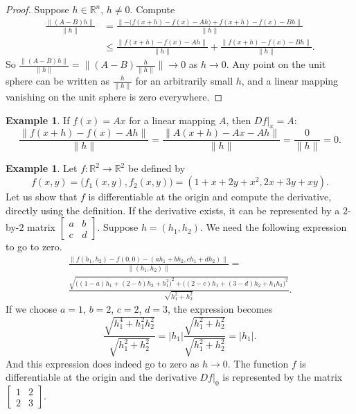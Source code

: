 \documentclass[12pt,openany]{book}
\newcommand{\sabs}[1]{\lvert {#1} \rvert}
\newcommand{\snorm}[1]{\lVert {#1} \rVert}
\newcommand{\bnorm}[1]{\bigl\lVert {#1} \bigr\rVert}
\newcommand{\R}{{\mathbb{R}}}
\theoremstyle{plain}
\theoremstyle{remark}
\theoremstyle{definition}
\theoremstyle{exercise}
\theoremstyle{example}
\newtheorem{example}[thm]{Example}
\begin{document}
\begin{proof}
Suppose $h \in \R^n$, $h \neq 0$.  Compute
\begin{equation*}
\begin{split}
\frac{\snorm{(A-B)h}}{\snorm{h}} & =
\frac{\snorm{-\bigl( f(x+h)-f(x) - Ah \bigr) + f(x+h)-f(x) - Bh}}{\snorm{h}} \\
& \leq
\frac{\snorm{f(x+h)-f(x) - Ah}}{\snorm{h}} + \frac{\snorm{f(x+h)-f(x) -
Bh}}{\snorm{h}} .
\end{split}
\end{equation*}
So 
$\frac{\snorm{(A-B)h}}{\snorm{h}} = \bnorm{(A-B)\frac{h}{\snorm{h}}} \to 0$
as $h \to 0$.  Any point on the unit sphere can be written as $\frac{h}{\snorm{h}}$
for an arbitrarily small $h$, and a linear mapping vanishing on the unit sphere is
zero everywhere.
\end{proof}

\begin{example}
If $f(x) = Ax$ for a linear mapping $A$, then
$Df|_x = A$:
\begin{equation*}
\frac{\snorm{f(x+h)-f(x) - Ah}}{\snorm{h}}
=
\frac{\snorm{A(x+h)-Ax - Ah}}{\snorm{h}}
=
\frac{0}{\snorm{h}} = 0 .
\end{equation*}
\end{example}

\begin{example}
Let $f \colon \R^2 \to \R^2$ be defined by
\begin{equation*}
f(x,y) = \bigl(f_1(x,y),f_2(x,y)\bigr) = (1+x+2y+x^2,2x+3y+xy).
\end{equation*}
Let us show that $f$ is differentiable at the origin and 
compute the derivative,
directly using the definition.  If the
derivative exists, it can be
represented by a $2$-by-$2$ matrix
$\left[\begin{smallmatrix}a&b\\c&d\end{smallmatrix}\right]$.  Suppose $h =
(h_1,h_2)$.  We need the following expression to go to zero.
\begin{multline*}
\frac{\snorm{
f(h_1,h_2)-f(0,0)
-
(ah_1 +bh_2 , ch_1+dh_2)}
}{\snorm{(h_1,h_2)}}
=
\\
\frac{\sqrt{
{\bigl((1-a)h_1 + (2-b)h_2 + h_1^2\bigr)}^2
+
{\bigl((2-c)h_1 + (3-d)h_2 + h_1h_2\bigr)}^2}}{\sqrt{h_1^2+h_2^2}} .
\end{multline*}
If we choose $a=1$, $b=2$, $c=2$, $d=3$, the expression becomes
\begin{equation*}
\frac{\sqrt{
h_1^4 + h_1^2h_2^2}}{\sqrt{h_1^2+h_2^2}}
=
\sabs{h_1}
\frac{\sqrt{
h_1^2 + h_2^2}}{\sqrt{h_1^2+h_2^2}}
= \sabs{h_1} .
\end{equation*}
And this expression does indeed go to zero as $h \to 0$.  The
function $f$ is differentiable at the origin and 
the derivative $Df|_0$ is represented by the matrix
$\left[\begin{smallmatrix}1&2\\2&3\end{smallmatrix}\right]$.
\end{example}
\end{document}
